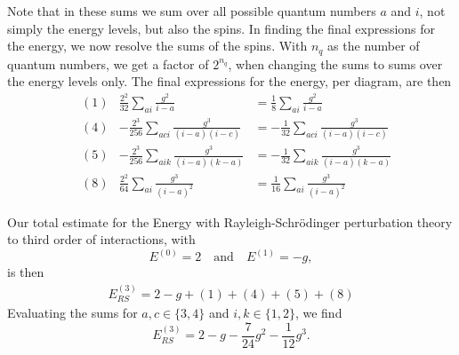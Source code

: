 Note that in these sums we sum over all possible quantum numbers $a$ and $i$, not simply the energy levels, but also the spins.
In finding the final expressions for the energy, we now resolve the sums of the spins.
With $n_q$ as the number of quantum numbers, we get a factor of $2^{n_q}$, when changing the sums to sums over the energy levels only.
The final expressions for the energy, per diagram, are then
\begin{align*}
    & (1) & \frac{2^2}{32} \sum_{ai} \frac{g^2}{i - a} &= \frac{1}{8} \sum_{ai} \frac{g^2}{i - a} \\
    & (4) & -\frac{2^3}{256} \sum_{aci} \frac{g^3}{(i-a)(i-c)} &= -\frac{1}{32} \sum_{aci} \frac{g^3}{(i-a)(i-c)} \\
    & (5) & -\frac{2^3}{256} \sum_{aik} \frac{g^3}{(i-a)(k-a)} &= -\frac{1}{32} \sum_{aik} \frac{g^3}{(i-a)(k-a)} \\
    & (8) & \frac{2^2}{64} \sum_{ai} \frac{g^3}{(i - a)^2} &= \frac{1}{16} \sum_{ai} \frac{g^3}{(i - a)^2} %
\end{align*}

Our total estimate for the Energy with Rayleigh-Schr\"odinger perturbation theory to third order of interactions, with
\begin{equation*}
    E^{(0)} = 2 \quad \text{and} \quad E^{(1)} = - g,
\end{equation*}
is then
\begin{align*}
    E_{RS}^{(3)} = 2 - g + (1) + (4) + (5) + (8)
\end{align*}
Evaluating the sums for $a,c \in \{3, 4\}$ and $i,k \in \{1, 2\}$, we find
\begin{equation*}
    E_{RS}^{(3)} %
    = 2 - g - \frac{7}{24} g^2 - \frac{1}{12} g^3.
\end{equation*}
